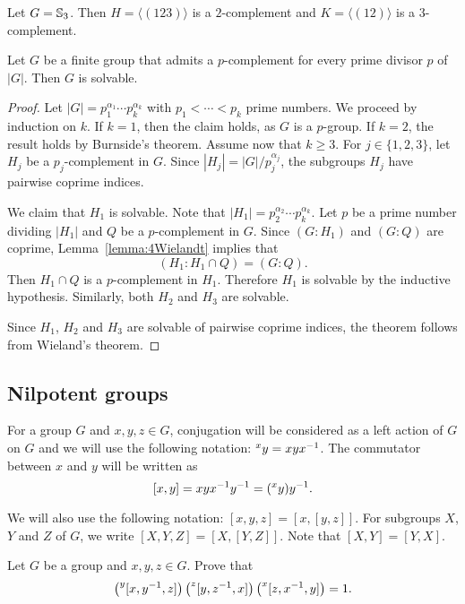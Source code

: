 \begin{example}
Let $G=\mathbb{S}_3$. Then $H=\langle (123)\rangle$ is a $2$-complement and 
$K=\langle (12)\rangle$ is a $3$-complement.
\end{example}

\begin{theorem}[Hall]
\label{theorem:Hall:solvable}
Let $G$ be a finite group that admits a $p$-complement for every prime divisor $p$ of $|G|$. 
Then $G$ is solvable. 
\end{theorem}

\begin{proof}
	Let $|G|=p_1^{\alpha_1}\cdots
	p_k^{\alpha_k}$ with $p_1<\cdots<p_k$ prime numbers. We proceed by induction on $k$. 
	If $k=1$, then the claim holds, as $G$ is a $p$-group. If $k=2$, the result holds by
        Burnside's theorem. Assume now that 
	$k\geq3$. For $j\in\{1,2,3\}$, let $H_j$ be a $p_j$-complement in 
	$G$. Since $|H_j|=|G|/p_j^{\alpha_j}$, the subgroups $H_j$ have pairwise coprime indices.

	We claim that $H_1$ is solvable. Note that $|H_1|=p_2^{\alpha_2}\cdots
	p_k^{\alpha_k}$. Let $p$ be a prime number dividing $|H_1|$ and $Q$ be a 
	$p$-complement in $G$. 
	Since $(G:H_1)$ and $(G:Q)$ are
	coprime, Lemma~\ref{lemma:4Wielandt} implies that  
	\[
	(H_1:H_1\cap Q)=(G:Q). 
	\]
	Then $H_1\cap Q$ is a $p$-complement in $H_1$.  Therefore $H_1$ is
	solvable by the inductive hypothesis. Similarly, both $H_2$ and 
	$H_3$ are solvable.

	Since $H_1$, $H_2$ and $H_3$ are solvable of pairwise coprime indices, 
        the theorem follows from Wieland's theorem. 
\end{proof}

\subsection{Nilpotent groups}

For a group $G$ and $x,y,z\in G$, conjugation will be considered as a left action of $G$ on $G$ 
and we will use the following notation: $\prescript{x}{}y=xyx^{-1}$. The commutator between $x$ and $y$ 
will be written as 
\[
[x,y]=xyx^{-1}y^{-1}=(\prescript{x}{}y)y^{-1}.
\]

We will also use the following notation:  
$[x,y,z]=[x,[y,z]]$. For subgroups $X$, $Y$ and $Z$ of $G$, we write 
$[X,Y,Z]=\left[ X,[Y,Z] \right]$. Note that $[X,Y]=[Y,X]$. 

\begin{exercise}
	\label{exercise:HallWitt}
	Let $G$ be a group and $x,y,z\in G$. Prove that 
	\begin{equation}
		\label{eq:HallWitt}
	\left(\prescript{y}{}[x,y^{-1},z]\right)\left(\prescript{z}{}[y,z^{-1},x]\right)\left(\prescript{x}{}[z,x^{-1},y]\right)=1.
	\end{equation}
\end{exercise}

